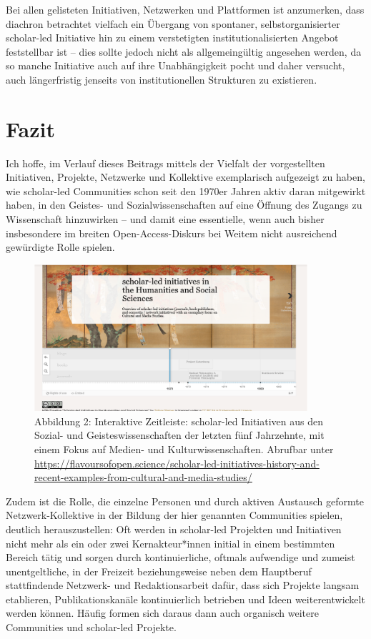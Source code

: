 \documentclass[a4paper,
fontsize=11pt,
oneside,
numbers=noperiodatend,
parskip=half-,
bibliography=totoc,
final
]{scrartcl}
\begin{document}
Bei allen gelisteten Initiativen, Netzwerken und Plattformen ist
anzumerken, dass diachron betrachtet vielfach ein Übergang von
spontaner, selbstorganisierter scholar-led Initiative hin zu einem
verstetigten institutionalisierten Angebot feststellbar ist -- dies
sollte jedoch nicht als allgemeingültig angesehen werden, da so manche
Initiative auch auf ihre Unabhängigkeit pocht und daher versucht, auch
längerfristig jenseits von institutionellen Strukturen zu existieren.

\hypertarget{fazit}{%
\section{Fazit}\label{fazit}}

Ich hoffe, im Verlauf dieses Beitrags mittels der Vielfalt der
vorgestellten Initiativen, Projekte, Netzwerke und Kollektive
exemplarisch aufgezeigt zu haben, wie scholar-led Communities schon seit
den 1970er Jahren aktiv daran mitgewirkt haben, in den Geistes- und
Sozialwissenschaften auf eine Öffnung des Zugangs zu Wissenschaft
hinzuwirken -- und damit eine essentielle, wenn auch bisher insbesondere
im breiten Open-Access-Diskurs bei Weitem nicht ausreichend gewürdigte
Rolle spielen.

\begin{figure}
\centering
\includegraphics[width=0.9\textwidth]{img/abb2.png}
\caption{Abbildung 2: Interaktive Zeitleiste: scholar-led Initiativen
aus den Sozial- und Geisteswissenschaften der letzten fünf Jahrzehnte,
mit einem Fokus auf Medien- und Kulturwissenschaften. Abrufbar unter
\url{https://flavoursofopen.science/scholar-led-initiatives-history-and-recent-examples-from-cultural-and-media-studies/}}
\end{figure}

Zudem ist die Rolle, die einzelne Personen und durch aktiven Austausch
geformte Netzwerk-Kollektive in der Bildung der hier genannten
Communities spielen, deutlich herauszustellen: Oft werden in scholar-led
Projekten und Initiativen nicht mehr als ein oder zwei Kernakteur*innen
initial in einem bestimmten Bereich tätig und sorgen durch
kontinuierliche, oftmals aufwendige und zumeist unentgeltliche, in der
Freizeit beziehungsweise neben dem Hauptberuf stattfindende Netzwerk-
und Redaktionsarbeit dafür, dass sich Projekte langsam etablieren,
Publikationskanäle kontinuierlich betrieben und Ideen weiterentwickelt
werden können. Häufig formen sich daraus dann auch organisch weitere
Communities und scholar-led Projekte.
\end{document}
